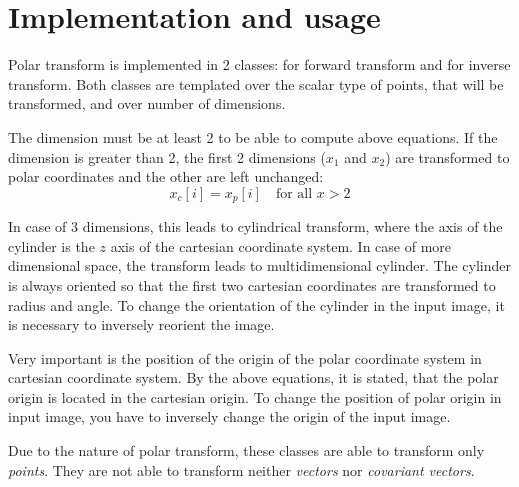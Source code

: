 \documentclass{InsightArticle}
\begin{document}
\section{Implementation and usage}

Polar transform is implemented in 2 classes:  for forward transform and  for inverse transform. Both classes are templated over the scalar type of points, that will be transformed, and over number of dimensions.

The dimension must be at least 2 to be able to compute above equations. If the dimension is greater than 2, the first 2 dimensions ($x_1$ and $x_2$) are transformed to polar coordinates and the other are left unchanged:
\begin{equation}
x_c[i] = x_p[i] \quad \textrm{for all } x>2
\end{equation}

In case of 3 dimensions, this leads to cylindrical transform, where the axis of the cylinder is the $z$ axis of the cartesian coordinate system. In case of more dimensional space, the transform leads to multidimensional cylinder. The cylinder is always oriented so that the first two cartesian coordinates are transformed to radius and angle. To change the orientation of the cylinder in the input image, it is necessary to inversely reorient the image.

Very important is the position of the origin of the polar coordinate system in cartesian coordinate system. By the above equations, it is stated, that the polar origin is located in the cartesian origin. To change the position of polar origin in input image, you have to inversely change the origin of the input image.

Due to the nature of polar transform, these classes are able to transform only \emph{points}. They are not able to transform neither \emph{vectors} nor \emph{covariant vectors}.


\appendix


%
%





\nocite{ITKSoftwareGuideSecondEdition}
\end{document}
